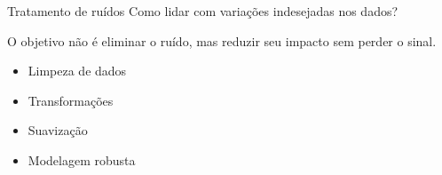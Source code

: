 \documentclass[
  ignorenonframetext,
  aspectratio=169,
]{beamer}
\providecommand{\tightlist}{%
  \setlength{\itemsep}{0pt}\setlength{\parskip}{0pt}}
\begin{document}
\begin{frame}{Tratamento de ruídos}
\label{tratamento-de-ruuxeddos-4}
Como lidar com variações indesejadas nos dados?

\begin{tcolorbox}[enhanced jigsaw, colback=white, rightrule=.15mm, opacityback=0, colframe=quarto-callout-important-color-frame, arc=.35mm, bottomrule=.15mm, leftrule=.75mm, toprule=.15mm, left=2mm, breakable]
\begin{minipage}[t]{5.5mm}
\textcolor{quarto-callout-important-color}{\faExclamation}
\end{minipage}%
\begin{minipage}[t]{\textwidth - 5.5mm}

O objetivo não é eliminar o ruído, mas reduzir seu impacto sem perder o
sinal.

\end{minipage}%
\end{tcolorbox}

\begin{itemize}
\tightlist
\item
  Limpeza de dados\\
\item
  Transformações\\
\item
  Suavização\\
\item
  Modelagem robusta
\end{itemize}
\end{frame}
\end{document}
